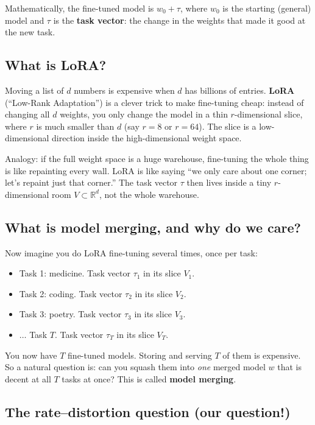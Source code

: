 \documentclass[11pt]{article}
\newcommand{\R}{\mathbb{R}}
\begin{document}
Mathematically, the fine-tuned model is $w_0 + \tau$, where $w_0$ is
the starting (general) model and $\tau$ is the \textbf{task vector}:
the change in the weights that made it good at the new task.

\subsection{What is LoRA?}

Moving a list of $d$ numbers is expensive when $d$ has billions of
entries. \textbf{LoRA} (``Low-Rank Adaptation'') is a clever trick to
make fine-tuning cheap: instead of changing all $d$ weights, you only
change the model in a thin $r$-dimensional slice, where $r$ is much
smaller than $d$ (say $r = 8$ or $r = 64$). The slice is a
low-dimensional direction inside the high-dimensional weight space.

Analogy: if the full weight space is a huge warehouse, fine-tuning the
whole thing is like repainting every wall. LoRA is like saying ``we
only care about one corner; let's repaint just that corner.'' The
task vector $\tau$ then lives inside a tiny $r$-dimensional room
$V\subset\R^d$, not the whole warehouse.

\subsection{What is model merging, and why do we care?}

Now imagine you do LoRA fine-tuning several times, once per task:
\begin{itemize}[nosep]
  \item Task 1: medicine. Task vector $\tau_1$ in its slice $V_1$.
  \item Task 2: coding. Task vector $\tau_2$ in its slice $V_2$.
  \item Task 3: poetry. Task vector $\tau_3$ in its slice $V_3$.
  \item $\ldots$ Task $T$. Task vector $\tau_T$ in its slice $V_T$.
\end{itemize}
You now have $T$ fine-tuned models. Storing and serving $T$ of them is
expensive. So a natural question is: can you squash them into
\emph{one} merged model $w$ that is decent at all $T$ tasks at once?
This is called \textbf{model merging}.

\subsection{The rate--distortion question (our question!)}
\end{document}
